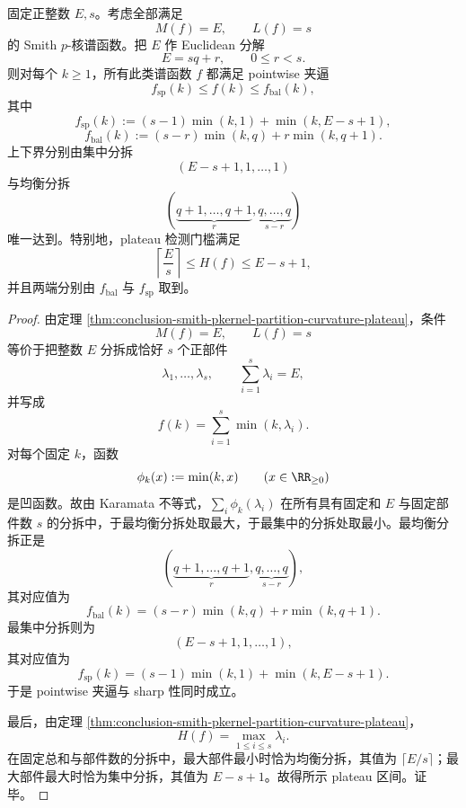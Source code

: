 \begin{theorem}\label{thm:conclusion-smith-pkernel-fixedmass-balance-spike-extremal}
固定正整数 \(E,s\)。考虑全部满足
\[
M(f)=E,
\qquad
L(f)=s
\]
的 Smith \(p\)-核谱函数。把 \(E\) 作 Euclidean 分解
\[
E=sq+r,
\qquad
0\le r<s.
\]
则对每个 \(k\ge 1\)，所有此类谱函数 \(f\) 都满足 pointwise 夹逼
\[
f_{\mathrm{sp}}(k)\le f(k)\le f_{\mathrm{bal}}(k),
\]
其中
\[
f_{\mathrm{sp}}(k):=(s-1)\min(k,1)+\min(k,E-s+1),
\]
\[
f_{\mathrm{bal}}(k):=(s-r)\min(k,q)+r\min(k,q+1).
\]
上下界分别由集中分拆
\[
(E-s+1,1,\dots,1)
\]
与均衡分拆
\[
(\underbrace{q+1,\dots,q+1}_{r},\underbrace{q,\dots,q}_{s-r})
\]
唯一达到。特别地，plateau 检测门槛满足
\[
\left\lceil\frac{E}{s}\right\rceil\le H(f)\le E-s+1,
\]
并且两端分别由 \(f_{\mathrm{bal}}\) 与 \(f_{\mathrm{sp}}\) 取到。
\end{theorem}
\begin{proof}
由定理 \ref{thm:conclusion-smith-pkernel-partition-curvature-plateau}，条件
\[
M(f)=E,
\qquad
L(f)=s
\]
等价于把整数 \(E\) 分拆成恰好 \(s\) 个正部件
\[
\lambda_1,\dots,\lambda_s,
\qquad
\sum_{i=1}^{s}\lambda_i=E,
\]
并写成
\[
f(k)=\sum_{i=1}^{s}\min(k,\lambda_i).
\]
对每个固定 \(k\)，函数
\[
\phi_k(x):=\min(k,x)
\qquad(x\in \RR_{\ge 0})
\]
是凹函数。故由 Karamata 不等式，\(\sum_i\phi_k(\lambda_i)\) 在所有具有固定和 \(E\) 与固定部件数 \(s\) 的分拆中，于最均衡分拆处取最大，于最集中的分拆处取最小。最均衡分拆正是
\[
(\underbrace{q+1,\dots,q+1}_{r},\underbrace{q,\dots,q}_{s-r}),
\]
其对应值为
\[
f_{\mathrm{bal}}(k)=(s-r)\min(k,q)+r\min(k,q+1).
\]
最集中分拆则为
\[
(E-s+1,1,\dots,1),
\]
其对应值为
\[
f_{\mathrm{sp}}(k)=(s-1)\min(k,1)+\min(k,E-s+1).
\]
于是 pointwise 夹逼与 sharp 性同时成立。

最后，由定理 \ref{thm:conclusion-smith-pkernel-partition-curvature-plateau}，
\[
H(f)=\max_{1\le i\le s}\lambda_i.
\]
在固定总和与部件数的分拆中，最大部件最小时恰为均衡分拆，其值为 \(\lceil E/s\rceil\)；最大部件最大时恰为集中分拆，其值为 \(E-s+1\)。故得所示 plateau 区间。证毕。
\end{proof}

